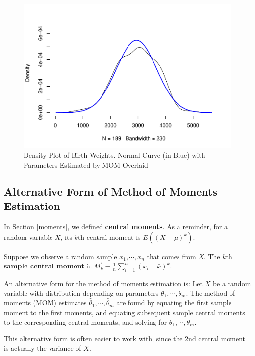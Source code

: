 \documentclass[
]{book}
\begin{document}
\begin{figure}
\centering
\includegraphics{bookdown-demo_files/figure-latex/7-MOM-1.pdf}
\caption{\label{fig:7-MOM}Density Plot of Birth Weights. Normal Curve (in Blue) with Parameters Estimated by MOM Overlaid}
\end{figure}

\hypertarget{alternative-form-of-method-of-moments-estimation}{%
\subsection{Alternative Form of Method of Moments Estimation}\label{alternative-form-of-method-of-moments-estimation}}

In Section \ref{moments}, we defined \textbf{central moments}. As a reminder, for a random variable \(X\), its \(k\)th central moment is \(E((X-\mu)^k)\).

Suppose we observe a random sample \(x_1, \cdots, x_n\) that comes from \(X\). The \(k\)th \textbf{sample central moment} is \(M_k^* = \frac{1}{n} \sum_{i=1}^n (x_i - \bar{x})^k\).

An alternative form for the method of moments estimation is: Let \(X\) be a random variable with distribution depending on parameters \(\theta_1, \cdots, \theta_m\). The method of moments (MOM) estimates \(\hat{\theta}_1, \cdots, \hat{\theta}_m\) are found by equating the first sample moment to the first moments, and equating subsequent sample central moments to the corresponding central moments, and solving for \(\theta_1, \cdots, \theta_m\).

This alternative form is often easier to work with, since the 2nd central moment is actually the variance of \(X\).
\end{document}
